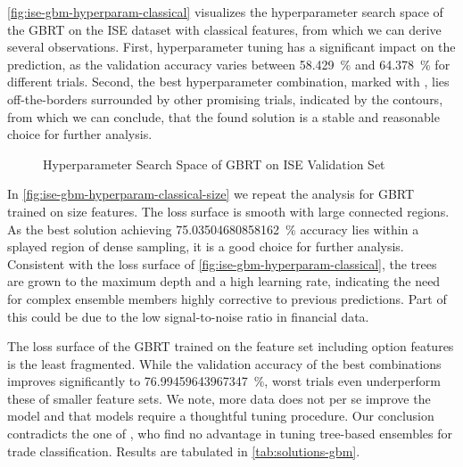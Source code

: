 \cref{fig:ise-gbm-hyperparam-classical} visualizes the hyperparameter search space of the \gls{GBRT} on the \gls{ISE} dataset with classical features, from which we can derive several observations. First, hyperparameter tuning has a significant impact on the prediction, as the validation accuracy varies between \SI{58.429}{\percent} and \SI{64.378}{\percent} for different trials. Second, the best hyperparameter combination, marked with \bestcircle, lies off-the-borders surrounded by other promising trials, indicated by the contours, from which we can conclude, that the found solution is a stable and reasonable choice for further analysis.

\begin{figure}[!h]
    \vfill
    \caption[Hyperparameter Search Space of Gradient-Boosting]{Hyperparameter Search Space of \gls{GBRT} on \gls{ISE} Validation Set}
    \label{fig:ise-gbm-hyperparam}
\end{figure}
\clearpage
\begin{figure}[!ht]
    \ContinuedFloat
\end{figure}

In \cref{fig:ise-gbm-hyperparam-classical-size} we repeat the analysis for \gls{GBRT} trained on size features. The loss surface is smooth with large connected regions. As the best solution achieving \SI{75.03504680858162}{\percent} accuracy lies within a splayed region of dense sampling, it is a good choice for further analysis. Consistent with the loss surface of \cref{fig:ise-gbm-hyperparam-classical}, the trees are grown to the maximum depth and a high learning rate, indicating the need for complex ensemble members highly corrective to previous predictions. Part of this could be due to the low signal-to-noise ratio in financial data.

The loss surface of the \gls{GBRT} trained on the feature set including option features is the least fragmented. While the validation accuracy of the best combinations improves significantly to \SI{76.99459643967347}{\percent}, worst trials even underperform these of smaller feature sets. We note, more data does not per se improve the model and that models require a thoughtful tuning procedure. Our conclusion contradicts the one of \textcite[\checkmark][14]{ronenMachineLearningTrade2022}, who find no advantage in tuning tree-based ensembles for trade classification. Results are tabulated in \cref{tab:solutions-gbm}.

